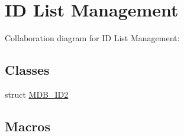 \hypertarget{group__idls}{}\section{ID List Management}
\label{group__idls}
Collaboration diagram for ID List Management\+:
\subsection*{Classes}
\begin{DoxyCompactItemize}
\item 
struct \mbox{\hyperlink{struct_m_d_b___i_d2}{M\+D\+B\+\_\+\+I\+D2}}
\end{DoxyCompactItemize}
\subsection*{Macros}
